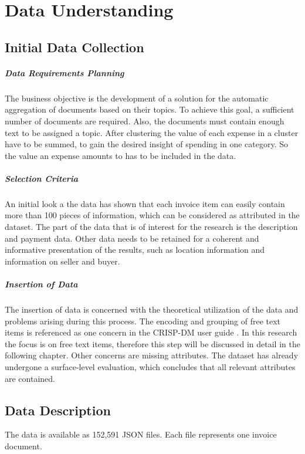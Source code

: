 \chapter{Data Understanding}

\section{Initial Data Collection}

\paragraph{Data Requirements Planning}
The business objective is the development of a solution for the automatic aggregation of documents based on their topics. To achieve this goal, a sufficient number of documents are required. Also, the documents must contain enough text to be assigned a topic. After clustering the value of each expense in a cluster have to be summed, to gain the desired insight of spending in one category. So the value an expense amounts to has to be included in the data.

\paragraph{Selection Criteria}
An initial look a the data has shown that each invoice item can easily contain more than 100 pieces of information, which can be considered as attributed in the dataset. The part of the data that is of interest for the research is the description and payment data. Other data needs to be retained for a coherent and informative presentation of the results, such as location information and information on seller and buyer.

\paragraph{Insertion of Data}
The insertion of data is concerned with the theoretical utilization of the data and problems arising during this process. The encoding and grouping of free text items is referenced as one concern in the \ac{CRISP-DM} user guide \cite[p.~44]{CRISPDM2000}. In this research the focus is on free text items, therefore this step will be discussed in detail in the following chapter. 
Other concerns are missing attributes. The dataset has already undergone a surface-level evaluation, which concludes that all relevant attributes are contained.

\section{Data Description}
The data is available as 152,591 \ac{JSON} files. Each file represents one invoice document. 

